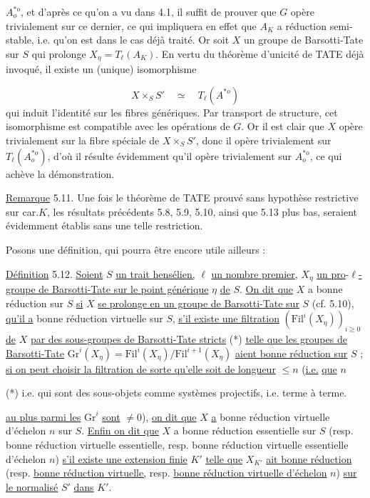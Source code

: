 $A^{*o}_o$, et d'après ce qu'on a vu dans 4.1, il suffit de prouver que $G$ opère trivialement sur ce dernier, ce qui impliquera en effet que $A_K$ a réduction semi-stable, i.e. qu'on est dans le cas déjà traité. Or soit $X$ un groupe de Barsotti-Tate sur $S$ qui prolonge $X_\eta = T_\ell(A_K)$. En vertu du théorème d'unicité de TATE déjà invoqué, il existe un (unique) isomorphisme

\begin{equation*}
X \times_S S' \quad \simeq \quad T_\ell(A^{*o})
\end{equation*}
qui induit l'identité sur les fibres génériques. Par transport de structure, cet isomorphisme est compatible avec les opérations de $G$. Or il est clair que $X$ opère trivialement sur la fibre spéciale de $X \times_S S'$, donc il opère trivialement sur $T_\ell(A^{*o}_o)$, d'où il résulte évidemment qu'il opère trivialement sur $A^{*o}_o$, ce qui achève la démonstration.

\underline{Remarque} 5.11. Une fois le théorème de TATE prouvé sans hypothèse restrictive sur car.$K$, les résultats précédents 5.8, 5.9, 5.10, ainsi que 5.13 plus bas, seraient évidemment établis sans une telle restriction.

Posons une définition, qui pourra être encore utile ailleurs :

\underline{Définition} 5.12. \underline{Soient} $S$ \underline{un trait hensélien,} $\ell$ \underline{un nombre premier}, $X_\eta$ \underline{un pro}-$\ell$\underline{-groupe de Barsotti-Tate sur le point générique} $\eta$ \underline{de} $S$. \underline{On dit que} $X$ a bonne réduction sur $S$ \underline{si} $X$ \underline{se prolonge en un groupe de Barsotti-Tate sur} $S$ (cf. 5.10), \underline{qu'il a} bonne réduction virtuelle sur $S$, \underline{s'il existe une filtration} $(\mathrm{Fil}^i(X_\eta))_{i \geq 0}$ \underline{de} $X$ \underline{par des sous-groupes de Barsotti-Tate stricts} (*) \underline{telle que les groupes de Barsotti-Tate} $\mathrm{Gr}^i(X_\eta) = \mathrm{Fil}^i(X_\eta)/\mathrm{Fil}^{i+1}(X_\eta)$ \underline{aient bonne réduction sur} $S$ ; \underline{si on peut choisir la filtration de sorte qu'elle soit de longueur} $\leq n$ (\underline{i.e.} \underline{que} $n$

(*) i.e. qui sont des sous-objets comme systèmes projectifs, i.e. terme à terme.



\underline{au plus parmi les} $\mathrm{Gr}^i$ \underline{sont} $\neq 0$), \underline{on dit que} $X$ \underline{a} bonne réduction virtuelle d'échelon $n$ sur $S$. \underline{Enfin on dit que} $X$ a bonne réduction essentielle sur $S$ (resp. bonne réduction virtuelle essentielle, resp. bonne réduction virtuelle essentielle d'échelon $n$) \underline{s'il existe une extension finie} $K'$ \underline{telle que} $X_{K'}$ \underline{ait bonne réduction} (resp. \underline{bonne réduction virtuelle,} resp. \underline{bonne réduction virtuelle d'échelon} $n$) \underline{sur le normalisé} $S'$ \underline{dans} $K'$.

